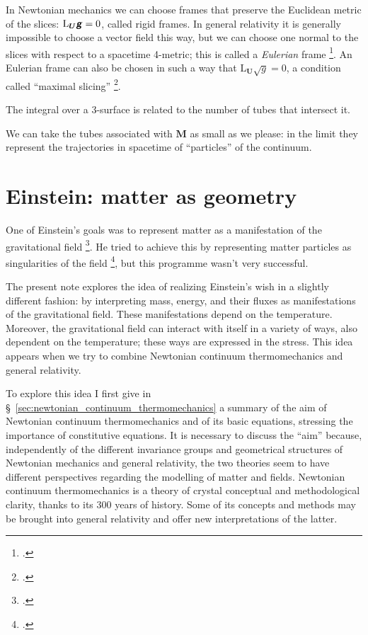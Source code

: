 \documentclass[\ifafour a4paper,12pt,\else a5paper,10pt,\fi%
onecolumn,oneside,article,%
british%
]{memoir}
\theoremstyle{remark}
\theoremstyle{innote}
\newcommand*{\mathte}[1]{\textbf{\textit{\textsf{#1}}}}
\newcommand*{\citep}{\footcites}
\renewcommand*{\|}[1][]{\nonscript\,#1\vert\nonscript\;\mathopen{}}
\newcommand*{\sect}{\S}%
\newcommand*{\Li}{\mathrm{L}}
\newcommand*{\yrr}{M}
\newcommand*{\yr}{\bm{\yrr}}
\newcommand*{\yFF}{U}
\newcommand*{\yF}{\bm{\yFF}}
\newcommand*{\ygg}{g}
\newcommand*{\yg}{\mathte{\ygg}}
\newcommand*{\ygv}{\sqrt{\ygg}}
\begin{document}
\bigskip

In Newtonian mechanics we can choose frames that preserve the Euclidean
metric of the slices: $\Li_{\yF}\yg = 0$, called rigid frames. In general
relativity it is generally impossible to choose a vector field this way,
but we can choose one normal to the slices with respect to a spacetime
4-metric; this is called a \emph{Eulerian} frame
\citep{smarretal1978,smarretal1980}. An Eulerian frame can also be chosen in
such a way that $\Li_{\yF}\ygv=0$, a condition called \enquote{maximal
  slicing} \citep[\sect~III.B]{smarretal1978}.

The integral over a 3-surface is related
to the number of tubes that intersect it.

We can take the tubes associated with $\yr$ as small as we please: in the
limit they represent the trajectories in spacetime of \enquote{particles}
of the continuum.


\section{Einstein: matter as geometry}
\label{sec:einstein_matter_fields}

One of Einstein's goals was to represent matter as a manifestation of the
gravitational field \citep[see][]{havasetal1962,havas1967}. He tried to
achieve this by representing matter particles as singularities of the field
\citep{einsteinetal1938}, but this programme wasn't very successful.

The present note explores the idea of realizing Einstein's wish in a
slightly different fashion: by interpreting mass, energy, and their fluxes
as manifestations of the gravitational field. These manifestations depend
on the temperature. Moreover, the gravitational field can interact with
itself in a variety of ways, also dependent on the temperature; these ways
are expressed in the stress. This idea appears when we try to combine
Newtonian continuum thermomechanics and general relativity.

To explore this idea I first give in
\sect~\ref{sec:newtonian_continuum_thermomechanics} a summary of the aim of
Newtonian continuum thermomechanics and of its basic equations, stressing
the importance of constitutive equations. It is necessary to discuss the
\enquote{aim} because, independently of the different invariance groups and
geometrical structures of Newtonian mechanics and general relativity, the
two theories seem to have different perspectives regarding the modelling of
matter and fields. Newtonian continuum thermomechanics is a theory of
crystal conceptual and methodological clarity, thanks to its 300 years of
history. Some of its concepts and methods may be brought into general
relativity and offer new interpretations of the latter.
\end{document}
